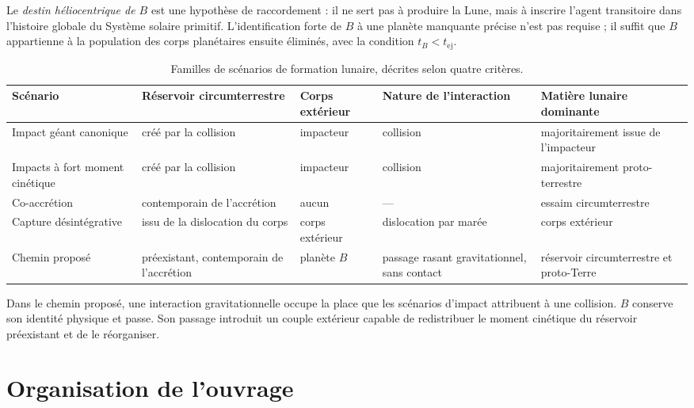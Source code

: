\documentclass[11pt,a4paper,openany]{report}
\begin{document}
Le \emph{destin héliocentrique de $B$} est une hypothèse de raccordement : il ne sert pas à produire
la Lune, mais à inscrire l'agent transitoire dans l'histoire globale du Système solaire primitif.
L'identification forte de $B$ à une planète manquante précise n'est pas requise ; il suffit que $B$
appartienne à la population des corps planétaires ensuite éliminés, avec la condition
$ t_B<t_{\mathrm{ej}} $.

\begin{table}[htbp]
\centering
\small
\caption{Familles de scénarios de formation lunaire, décrites selon quatre critères.}
\label{tab:scenarios}
\begin{tabularx}{\textwidth}{>{\raggedright\arraybackslash}p{2.7cm}
>{\raggedright\arraybackslash}X >{\raggedright\arraybackslash}X
>{\raggedright\arraybackslash}X >{\raggedright\arraybackslash}X}
\toprule
\textbf{Scénario} & \textbf{Réservoir circumterrestre} & \textbf{Corps extérieur} &
\textbf{Nature de l'interaction} & \textbf{Matière lunaire dominante} \\
\midrule
Impact géant canonique & créé par la collision & impacteur & collision &
majoritairement issue de l'impacteur \\[3pt]
Impacts à fort moment cinétique & créé par la collision & impacteur & collision &
majoritairement proto-terrestre \\[3pt]
Co-accrétion & contemporain de l'accrétion & aucun & --- & essaim circumterrestre \\[3pt]
Capture désintégrative \cite{Mitler1975} & issu de la dislocation du corps & corps
extérieur & dislocation par marée & corps extérieur \\[3pt]
Chemin proposé & préexistant, contemporain de l'accrétion & planète $B$ &
passage rasant gravitationnel, sans contact & réservoir circumterrestre et proto-Terre \\
\bottomrule
\end{tabularx}
\end{table}

\begin{lecture}
Dans le chemin proposé, une interaction gravitationnelle occupe la place que les scénarios
d'impact attribuent à une collision. $B$ conserve son identité physique et passe. Son passage
introduit un couple extérieur capable de redistribuer le moment cinétique du réservoir
préexistant et de le réorganiser.
\end{lecture}


\section{Organisation de l'ouvrage}
\end{document}
